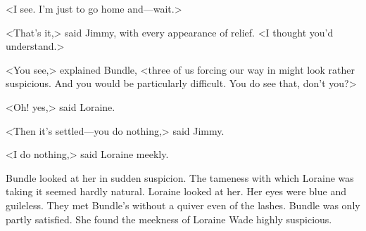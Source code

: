 <I see. I'm just to go home and—wait.>

<That's it,> said Jimmy, with every appearance of relief. <I thought you'd understand.>

<You see,> explained Bundle, <three of us forcing our way in might look rather suspicious. And you would be particularly difficult. You do see that, don't you?>

<Oh! yes,> said Loraine.

<Then it's settled—you do nothing,> said Jimmy.

<I do nothing,> said Loraine meekly.

Bundle looked at her in sudden suspicion. The tameness with which Loraine was taking it seemed hardly natural. Loraine looked at her. Her eyes were blue and guileless. They met Bundle's without a quiver even of the lashes. Bundle was only partly satisfied. She found the meekness of Loraine Wade highly suspicious.